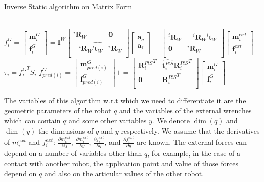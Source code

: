 \begin{algorithm}
  \caption{Inverse Static algorithm on Matrix Form}
\label{alg:ISmatrix}
\begin{algorithmic}
  \\
  $f^G_i =
  \begin{bmatrix}
    \mathbf{m}^{G}_i \\ \mathbf{f}^{G}_i
  \end{bmatrix}
  =
  \mathbf{I}^W
  \begin{bmatrix}
    {{}^i\mathbf{R}_W} & \mathbf{0} \\
    -{{}^i\mathbf{R}_W}\widehat{{}^i\mathbf{t}_W} & {{}^i\mathbf{R}_W} \\
  \end{bmatrix}
  \begin{bmatrix}
    \mathbf{a_c} \\ \mathbf{a_f}
  \end{bmatrix}
  -
  \begin{bmatrix}
    {{}^i\mathbf{R}_W} & -{{}^i\mathbf{R}_W}\widehat{{}^i\mathbf{t}_W} \\
    \mathbf{0} & {{}^i\mathbf{R}_W} \\
  \end{bmatrix}
  \begin{bmatrix}
    \mathbf{m}^{ext}_i \\ \mathbf{f}^{ext}_i
  \end{bmatrix}
  $
  \EndFor{}
  \State$\tau_i = {f^G_i}^T S_i$
  \State$f^G_{pred(i)} =
  \begin{bmatrix}
    \mathbf{m}^{G}_{pred(i)} \\ \mathbf{f}^{G}_{pred(i)}
  \end{bmatrix}
  +=
  \begin{bmatrix}
    {\mathbf{R}^{PtS}_i}^T & \widehat{\mathbf{t}^{PtS}_i}{\mathbf{R}^{PtS}_i}^T \\
    \mathbf{0} & {\mathbf{R}^{PtS}_i}^T \\
  \end{bmatrix}
  \begin{bmatrix}
    \mathbf{m}^{G}_i \\ \mathbf{f}^{G}_i
  \end{bmatrix}
  $
  \EndIf{}
  \EndFor{}
\end{algorithmic}
\end{algorithm}

The variables of this algorithm w.r.t which we need to differentiate it are the geometric parameters of the robot $q$ and the variables of the external wrenches which can contain $q$ and some other variables $y$.
We denote $\dim(q)$ and $\dim(y)$ the dimensions of $q$ and $y$ respectively.
We assume that the derivatives of $m_i^{ext}$ and $f_i^{ext}$: $\frac{\partial m_i^{ext}}{\partial q}$, $\frac{\partial m_i^{ext}}{\partial y}$, $\frac{\partial f_i^{ext}}{\partial q}$, and $\frac{\partial f_i^{ext}}{\partial y}$ are known.
The external forces can depend on a number of variables other than $q$, for example, in the case of a contact with another robot, the application point and value of those forces depend on $q$ and also on the articular values of the other robot.

